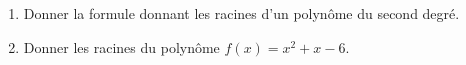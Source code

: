 
\begin{exercice}\label{exoPremiere-0096}

    \begin{enumerate}
        \item
            Donner la formule donnant les racines d'un polynôme du second degré.
        \item
            Donner les racines du polynôme \( f(x)=x^2+x-6\).
    \end{enumerate}

\end{exercice}
